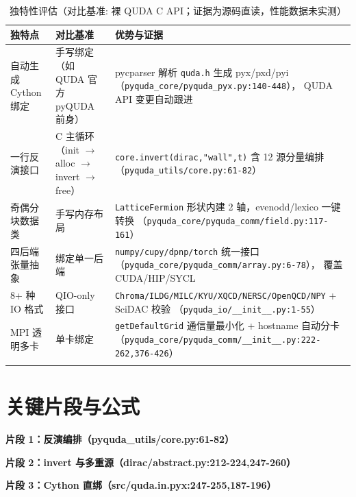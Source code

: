\documentclass[UTF8]{ctexart}
\begin{document}
\begin{xltabular}{\textwidth}{lXX}
\toprule
\textcolor{algo}{独特点} & 对比基准 & 优势与证据 \\
\midrule
\endhead
自动生成 Cython 绑定 & 手写绑定（如 QUDA 官方 pyQUDA 前身） &
pycparser 解析 \texttt{quda.h} 生成 pyx/pxd/pyi（\texttt{\nolinkurl{pyquda_core/pyquda_pyx.py:140-448}}），
QUDA API 变更自动跟进 \\
一行反演接口 & C 主循环（init $\rightarrow$ alloc $\rightarrow$ invert $\rightarrow$ free） &
\texttt{core.invert(dirac,"wall",t)} 含 12 源分量编排
（\texttt{\nolinkurl{pyquda_utils/core.py:61-82}}） \\
奇偶分块数据类 & 手写内存布局 &
\texttt{LatticeFermion} 形状内建 2 轴，evenodd/lexico 一键转换
（\texttt{\nolinkurl{pyquda_core/pyquda_comm/field.py:117-161}}） \\
四后端张量抽象 & 绑定单一后端 &
\texttt{\nolinkurl{numpy/cupy/dpnp/torch}} 统一接口（\texttt{\nolinkurl{pyquda_core/pyquda_comm/array.py:6-78}}），
覆盖 CUDA/HIP/SYCL \\
8+ 种 IO 格式 & QIO-only 接口 &
\texttt{\nolinkurl{Chroma/ILDG/MILC/KYU/XQCD/NERSC/OpenQCD/NPY}} + SciDAC 校验
（\texttt{\nolinkurl{pyquda_io/__init__.py:1-55}}） \\
MPI 透明多卡 & 单卡绑定 &
\texttt{getDefaultGrid} 通信量最小化 + hostname 自动分卡
（\texttt{\nolinkurl{pyquda_core/pyquda_comm/__init__.py:222-262,376-426}}） \\
\bottomrule
\caption{独特性评估（对比基准: 裸 QUDA C API；证据为源码直读，性能数据未实测）}
\end{xltabular}

\section{关键片段与公式}
\textbf{片段 1：反演编排（pyquda\_utils/core.py:61-82）}


\textbf{片段 2：invert 与多重源（dirac/abstract.py:212-224,247-260）}



\textbf{片段 3：Cython 直绑（src/quda.in.pyx:247-255,187-196）}


\end{document}
